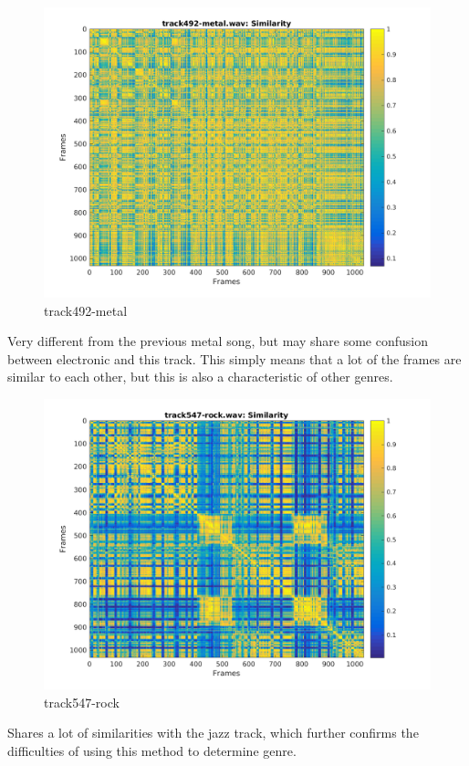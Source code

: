 \documentclass[11pt, a4paper]{article}
\begin{document}
\begin{figure}[H]
    \centering
    \includegraphics[width=.8\textwidth]{track492-metal-similarity.png}
    \caption{track492-metal}
\end{figure}

Very different from the previous metal song, but may share some confusion between electronic and this track. This simply means that a lot of the frames are similar to each other, but this is also a characteristic of other genres. 

\begin{figure}[H]
    \centering
    \includegraphics[width=.8\textwidth]{track547-rock-similarity.png}
    \caption{track547-rock}
\end{figure}

Shares a lot of similarities with the jazz track, which further confirms the difficulties of using this method to determine genre. 
\end{document}
